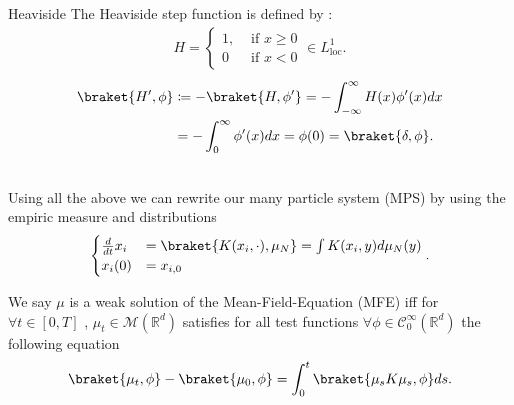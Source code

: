 \begin{example}{Heaviside}
The Heaviside step function is defined by :
\begin{align*}
  H = \begin{cases}
    1, &\text{ if }x\ge 0 \\
    0 &\text{ if } x<0
  \end{cases} \in  L_{\text{loc}}^{1} 
.\end{align*}
\begin{align*}
  \braket{H',\phi } &\coloneqq  - \braket{H,\phi'} = - \int_{-\infty}^{\infty} H(x)\phi'(x) dx\\
                    &= - \int_0^{\infty} \phi'(x) dx = \phi(0)  =\braket{\delta,\phi }
.\end{align*}
\begin{figure}[H]
  \begin{center}
  \end{center}
\end{figure}
\end{example}
\hspace{0mm}\\
Using all the above we can rewrite our many particle system  (MPS) by using the empiric measure and distributions 
\begin{align*}
  \begin{cases}
    \frac{d}{dt} x_i &=  \braket{K(x_i,\cdot) , \mu_N}  = \int K(x_i,y) d\mu_N(y)\\ 
    x_i(0) &= x_{i,0}
  \end{cases}
.\end{align*}
\begin{definition}
  We say $\mu $ is a weak solution of the Mean-Field-Equation (MFE) iff for $\forall  t \in  [0,T]$ , $\mu_t \in  \mathcal{M}(\mathbb{R}^{d} )$ satisfies for 
  all test functions  $\forall  \phi  \in  \mathcal{C}^{\infty}_0(\mathbb{R}^{d } )$ the following equation
  \begin{align*}
    \braket{\mu_t,\phi } - \braket{\mu_0,\phi } = \int_0^{t}  \braket{\mu_sK\mu_s,\phi } ds
  .\end{align*}
\end{definition}
